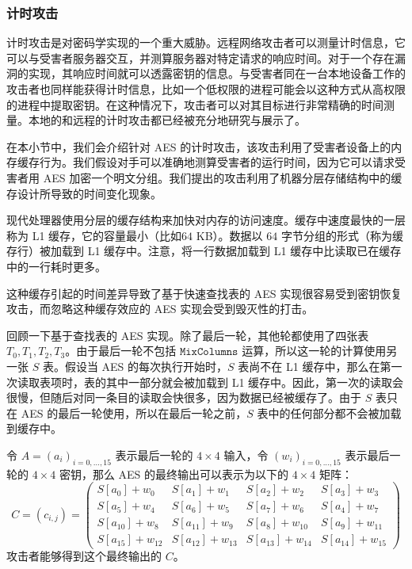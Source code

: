 \subsubsection{计时攻击}

计时攻击是对密码学实现的一个重大威胁。远程网络攻击者可以测量计时信息，它可以与受害者服务器交互，并测算服务器对特定请求的响应时间。对于一个存在漏洞的实现，其响应时间就可以透露密钥的信息。与受害者同在一台本地设备工作的攻击者也同样能获得计时信息，比如一个低权限的进程可能会以这种方式从高权限的进程中提取密钥。在这种情况下，攻击者可以对其目标进行非常精确的时间测量。本地的和远程的计时攻击都已经被充分地研究与展示了。

在本小节中，我们会介绍针对 AES 的计时攻击，该攻击利用了受害者设备上的内存缓存行为。我们假设对手可以准确地测算受害者的运行时间，因为它可以请求受害者用 AES 加密一个明文分组。我们提出的攻击利用了机器分层存储结构中的缓存设计所导致的时间变化现象。

现代处理器使用分层的缓存结构来加快对内存的访问速度。缓存中速度最快的一层称为 L1 缓存，它的容量最小（比如$64$ KB）。数据以 $64$ 字节分组的形式（称为缓存行）被加载到 L1 缓存中。注意，将一行数据加载到 L1 缓存中比读取已在缓存中的一行耗时更多。

这种缓存引起的时间差异导致了基于快速查找表的 AES 实现很容易受到密钥恢复攻击，而忽略这种缓存效应的 AES 实现会受到毁灭性的打击。

回顾一下基于查找表的 AES 实现。除了最后一轮，其他轮都使用了四张表 $T_0,T_1,T_2,T_3$。由于最后一轮不包括 $\mathtt{MixColumns}$ 运算，所以这一轮的计算使用另一张 $S$ 表。假设当 AES 的每次执行开始时，$S$ 表尚不在 L1 缓存中，那么在第一次读取表项时，表的其中一部分就会被加载到 L1 缓存中。因此，第一次的读取会很慢，但随后对同一条目的读取会快很多，因为数据已经被缓存了。由于 $S$ 表只在 AES 的最后一轮使用，所以在最后一轮之前，$S$ 表中的任何部分都不会被加载到缓存中。

令 $A=(a_i)_{i=0,\dots,15}$ 表示最后一轮的 $4\times4$ 输入，令 $(w_i)_{i=0,...,15}$ 表示最后一轮的 $4\times4$ 密钥，那么 AES 的最终输出可以表示为以下的 $4\times4$ 矩阵：
\begin{equation}\label{eq:4-19}
	C=(c_{i,j})=
	\begin{pmatrix}
		S[a_0]+w_0 & S[a_1]+w_1 & S[a_2]+w_2 & S[a_3]+w_3\\
		S[a_5]+w_4 & S[a_6]+w_5 & S[a_7]+w_6 & S[a_4]+w_7\\
		S[a_{10}]+w_8 & S[a_{11}]+w_9 & S[a_8]+w_{10} & S[a_9]+w_{11}\\
		S[a_{15}]+w_{12} & S[a_{12}]+w_{13} & S[a_{13}]+w_{14} & S[a_{14}]+w_{15}
	\end{pmatrix}
\end{equation}
攻击者能够得到这个最终输出的 $C$。

